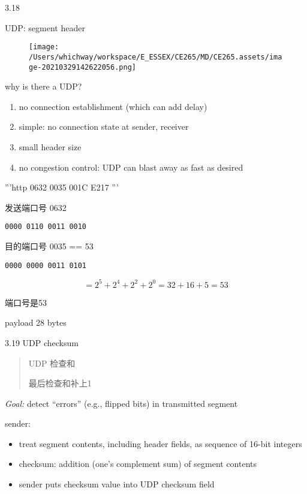 \documentclass[
]{article}
\begin{document}
3.18

UDP: segment header

\begin{figure}
\centering
\texttt{[image: /Users/whichway/workspace/E\_ESSEX/CE265/MD/CE265.assets/image-20210329142622056.png]}
\caption{}
\end{figure}

why is there a UDP?

\begin{enumerate}
\def\labelenumi{\arabic{enumi}.}
\item
  no connection establishment (which can add delay)
\item
  simple: no connection state at sender, receiver
\item
  small header size
\item
  no congestion control: UDP can blast away as fast as desired
\end{enumerate}

'''http 0632 0035 001C E217 '''

发送端口号 0632

\begin{verbatim}
0000 0110 0011 0010
\end{verbatim}

目的端口号 0035 == 53

\begin{verbatim}
0000 0000 0011 0101
\end{verbatim}

\[=2^5+2^4+2^2+2^0=32+16+5=53\]

端口号是53

payload 28 bytes

3.19 UDP checksum

\begin{quote}
UDP 检查和

最后检查和补上1
\end{quote}

\emph{Goal:} detect ``errors'' (e.g., flipped bits) in transmitted
segment

sender:

\begin{itemize}
\item
  treat segment contents, including header fields, as sequence of 16-bit
  integers
\item
  checksum: addition (one's complement sum) of segment contents
\item
  sender puts checksum value into UDP checksum field
\end{itemize}
\end{document}
